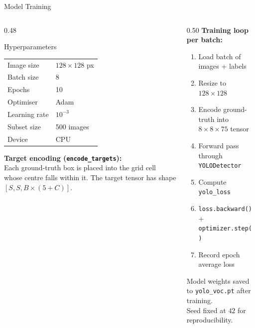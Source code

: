 \documentclass[aspectratio=169,10pt]{beamer}
\begin{document}
\begin{frame}{Model Training}
\begin{columns}[T]
\begin{column}{0.48\textwidth}
  \begin{block}{Hyperparameters}
    \begin{tabular}{ll}
      Image size    & $128 \times 128$ px \\[3pt]
      Batch size    & 8                   \\[3pt]
      Epochs        & 10                  \\[3pt]
      Optimiser     & Adam                \\[3pt]
      Learning rate & $10^{-3}$           \\[3pt]
      Subset size   & 500 images          \\[3pt]
      Device        & CPU                 \\
    \end{tabular}
  \end{block}

  \vspace{0.1cm}
  \textbf{Target encoding (\texttt{encode\_targets}):}\\
  Each ground-truth box is placed into the grid cell
  whose centre falls within it. The target tensor has
  shape $[S, S, B{\times}(5{+}C)]$.
\end{column}
\begin{column}{0.50\textwidth}
  \textbf{Training loop per batch:}
  \begin{enumerate}
    \item Load batch of images + labels
    \item Resize to $128\times128$
    \item Encode ground-truth into $8\times8\times75$ tensor
    \item Forward pass through \texttt{YOLODetector}
    \item Compute \texttt{yolo\_loss}
    \item \texttt{loss.backward()} + \texttt{optimizer.step()}
    \item Record epoch average loss
  \end{enumerate}

  \vspace{0.1cm}
  Model weights saved to \texttt{yolo\_voc.pt} after training.\\[4pt]
  Seed fixed at $42$ for reproducibility.
\end{column}
\end{columns}
\end{frame}
\end{document}
